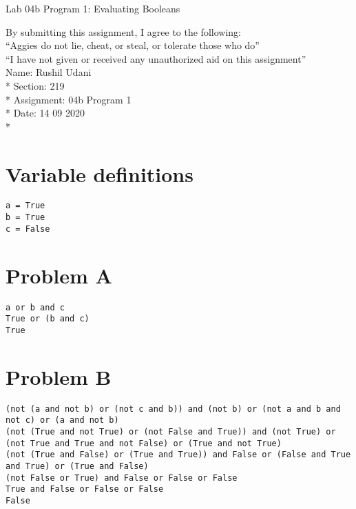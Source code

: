 \documentclass{article}
\begin{document}
{\Large Lab 04b Program 1: Evaluating Booleans}
\vspace{0.5cm}

\noindent
By submitting this assignment, I agree to the following: \\
 ``Aggies do not lie, cheat, or steal, or tolerate those who do'' \\
 ``I have not given or received any unauthorized aid on this assignment'' \\

\noindent
Name:        Rushil Udani \\*
Section:     219 \\*
Assignment:  04b Program 1 \\*
Date:        14 09 2020 \\*

\hrulefill

\section*{Variable definitions}

\begin{verbatim}
a = True
b = True
c = False
\end{verbatim}

\section*{Problem A}
\begin{verbatim}
a or b and c
True or (b and c)
True
\end{verbatim}

\section*{Problem B}
\begin{verbatim}
(not (a and not b) or (not c and b)) and (not b) or (not a and b and not c) or (a and not b)
(not (True and not True) or (not False and True)) and (not True) or (not True and True and not False) or (True and not True)
(not (True and False) or (True and True)) and False or (False and True and True) or (True and False)
(not False or True) and False or False or False
True and False or False or False
False
\end{verbatim}
\end{document}
